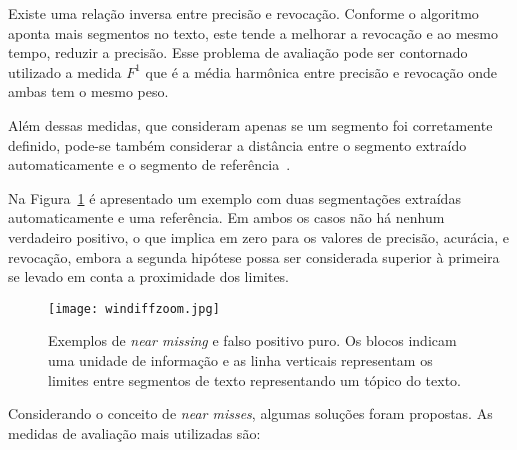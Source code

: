 Existe uma relação inversa entre precisão e revocação. Conforme o algoritmo aponta mais segmentos no texto, este tende a melhorar a revocação e ao mesmo tempo, reduzir a precisão. 
%
Esse problema de avaliação pode ser contornado utilizado a medida $F^1$ que é a média harmônica entre precisão e revocação onde ambas tem o mesmo peso. 

Além dessas medidas, que consideram apenas se um segmento foi corretamente definido, pode-se também considerar a distância entre o segmento extraído automaticamente e o segmento de referência~\cite{Kern2009}.


Na Figura~\ref{fig:exemplosegmentacaozoom} é apresentado um exemplo com duas segmentações extraídas automaticamente e uma referência. Em ambos os casos não há nenhum verdadeiro positivo, o que implica em zero para os valores de precisão, acurácia, e revocação, embora a segunda hipótese possa ser considerada superior à primeira se levado em conta a proximidade dos limites.



  \begin{figure}[!h]

	\centering
	\texttt{[image: windiffzoom.jpg]}
	\caption{Exemplos de \textit{near missing} e falso positivo puro. Os blocos indicam uma unidade de informação e as linha verticais representam os limites entre segmentos de texto representando um tópico do texto. }
	\label{fig:exemplosegmentacaozoom}

  \end{figure}
  

Considerando o conceito de \textit{near misses}, algumas soluções foram propostas. As medidas de avaliação mais utilizadas são:

